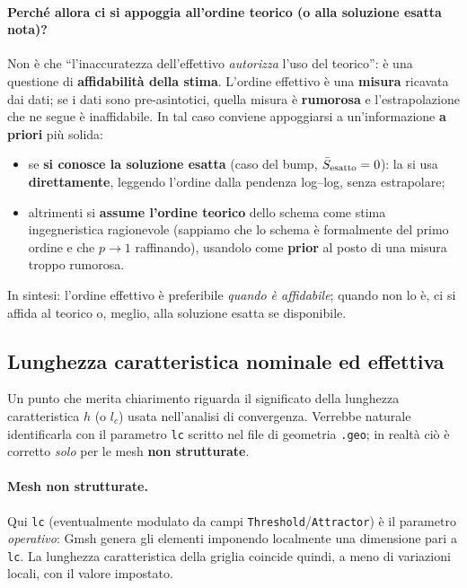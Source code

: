 \paragraph{Perché allora ci si appoggia all'ordine teorico (o alla soluzione esatta nota)?}
Non è che ``l'inaccuratezza dell'effettivo \emph{autorizza} l'uso del teorico'': è una questione di
\textbf{affidabilità della stima}. L'ordine effettivo è una \textbf{misura} ricavata dai dati; se i
dati sono pre-asintotici, quella misura è \textbf{rumorosa} e l'estrapolazione che ne segue è
inaffidabile. In tal caso conviene appoggiarsi a un'informazione \textbf{a priori} più solida:
\begin{itemize}
  \item se \textbf{si conosce la soluzione esatta} (caso del bump, $\bar S_{\rm esatto}=0$): la si
    usa \textbf{direttamente}, leggendo l'ordine dalla pendenza log--log, senza estrapolare;
  \item altrimenti si \textbf{assume l'ordine teorico} dello schema come stima ingegneristica
    ragionevole (sappiamo che lo schema è formalmente del primo ordine e che $p\to1$ raffinando),
    usandolo come \textbf{prior} al posto di una misura troppo rumorosa.
\end{itemize}
In sintesi: l'ordine effettivo è preferibile \emph{quando è affidabile}; quando non lo è, ci si
affida al teorico o, meglio, alla soluzione esatta se disponibile.

\subsection{Lunghezza caratteristica nominale ed effettiva}
\label{subsec:lc_eff}

Un punto che merita chiarimento riguarda il significato della lunghezza caratteristica $h$ (o
$l_c$) usata nell'analisi di convergenza. Verrebbe naturale identificarla con il parametro
\texttt{lc} scritto nel file di geometria \texttt{.geo}; in realtà ciò è corretto \emph{solo}
per le mesh \textbf{non strutturate}.

\paragraph{Mesh non strutturate.} Qui \texttt{lc} (eventualmente modulato da campi
\texttt{Threshold}/\texttt{Attractor}) è il parametro \emph{operativo}: Gmsh genera gli elementi
imponendo localmente una dimensione pari a \texttt{lc}. La lunghezza caratteristica della griglia
coincide quindi, a meno di variazioni locali, con il valore impostato.

